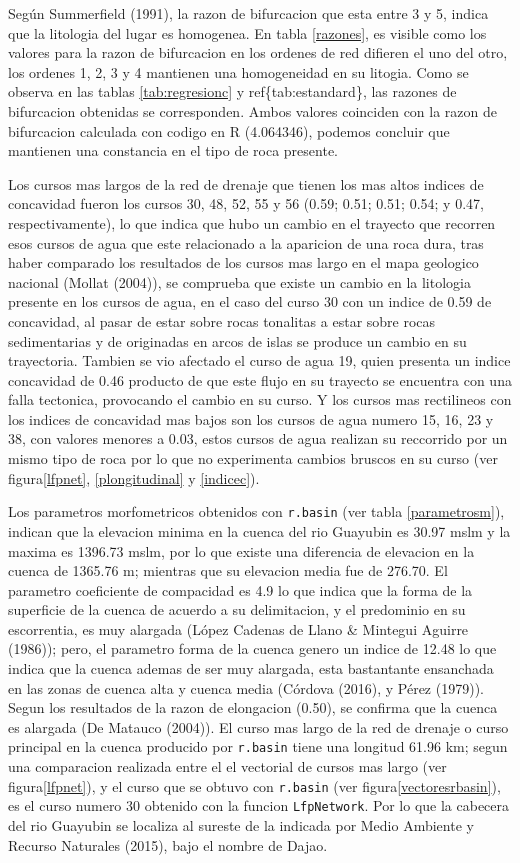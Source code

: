 \documentclass[11pt,]{article}
\begin{document}
Según Summerfield (1991), la razon de bifurcacion que esta entre 3 y 5,
indica que la litologia del lugar es homogenea. En tabla \ref{razones},
es visible como los valores para la razon de bifurcacion en los ordenes
de red difieren el uno del otro, los ordenes 1, 2, 3 y 4 mantienen una
homogeneidad en su litogia. Como se observa en las tablas
\ref{tab:regresionc} y ref\{tab:estandard\}, las razones de bifurcacion
obtenidas se corresponden. Ambos valores coinciden con la razon de
bifurcacion calculada con codigo en R (4.064346), podemos concluir que
mantienen una constancia en el tipo de roca presente.

Los cursos mas largos de la red de drenaje que tienen los mas altos
indices de concavidad fueron los cursos 30, 48, 52, 55 y 56 (0.59; 0.51;
0.51; 0.54; y 0.47, respectivamente), lo que indica que hubo un cambio
en el trayecto que recorren esos cursos de agua que este relacionado a
la aparicion de una roca dura, tras haber comparado los resultados de
los cursos mas largo en el mapa geologico nacional (Mollat (2004)), se
comprueba que existe un cambio en la litologia presente en los cursos de
agua, en el caso del curso 30 con un indice de 0.59 de concavidad, al
pasar de estar sobre rocas tonalitas a estar sobre rocas sedimentarias y
de originadas en arcos de islas se produce un cambio en su trayectoria.
Tambien se vio afectado el curso de agua 19, quien presenta un indice
concavidad de 0.46 producto de que este flujo en su trayecto se
encuentra con una falla tectonica, provocando el cambio en su curso. Y
los cursos mas rectilineos con los indices de concavidad mas bajos son
los cursos de agua numero 15, 16, 23 y 38, con valores menores a 0.03,
estos cursos de agua realizan su reccorrido por un mismo tipo de roca
por lo que no experimenta cambios bruscos en su curso (ver
figura\ref{lfpnet}, \ref{plongitudinal} y \ref{indicec}).

Los parametros morfometricos obtenidos con \texttt{r.basin} (ver tabla
\ref{parametrosm}), indican que la elevacion minima en la cuenca del rio
Guayubin es 30.97 mslm y la maxima es 1396.73 mslm, por lo que existe
una diferencia de elevacion en la cuenca de 1365.76 m; mientras que su
elevacion media fue de 276.70. El parametro coeficiente de compacidad es
4.9 lo que indica que la forma de la superficie de la cuenca de acuerdo
a su delimitacion, y el predominio en su escorrentia, es muy alargada
(López Cadenas de Llano \& Mintegui Aguirre (1986)); pero, el parametro
forma de la cuenca genero un indice de 12.48 lo que indica que la cuenca
ademas de ser muy alargada, esta bastantante ensanchada en las zonas de
cuenca alta y cuenca media (Córdova (2016), y Pérez (1979)). Segun los
resultados de la razon de elongacion (0.50), se confirma que la cuenca
es alargada (De Matauco (2004)). El curso mas largo de la red de drenaje
o curso principal en la cuenca producido por \texttt{r.basin} tiene una
longitud 61.96 km; segun una comparacion realizada entre el el vectorial
de cursos mas largo (ver figura\ref{lfpnet}), y el curso que se obtuvo
con \texttt{r.basin} (ver figura\ref{vectoresrbasin}), es el curso
numero 30 obtenido con la funcion \texttt{LfpNetwork}. Por lo que la
cabecera del rio Guayubin se localiza al sureste de la indicada por
Medio Ambiente y Recurso Naturales (2015), bajo el nombre de Dajao.
\end{document}
